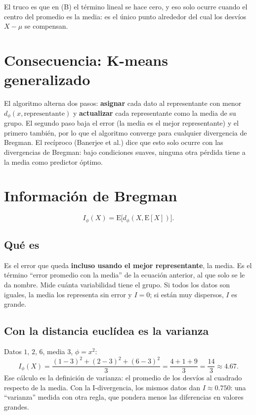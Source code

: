 \documentclass[11pt,a4paper]{article}
\newenvironment{idea}{\par\begin{center}\begin{lrbox}{\ideabox}\begin{minipage}{0.9\linewidth}}{\end{minipage}\end{lrbox}\fcolorbox{blue!40!black}{blue!5}{\usebox{\ideabox}}\end{center}}
\begin{document}
\begin{idea}
El truco es que en (B) el término lineal se hace cero, y eso solo ocurre cuando el
centro del promedio es la media: es el único punto alrededor del cual los desvíos
$X-\mu$ se compensan.
\end{idea}

\section{Consecuencia: K-means generalizado}

El algoritmo alterna dos pasos: \textbf{asignar} cada dato al representante con
menor $d_\phi(x,\text{representante})$ y \textbf{actualizar} cada representante
como la media de su grupo. El segundo paso baja el error (la media es el mejor
representante) y el primero también, por lo que el algoritmo converge para
cualquier divergencia de Bregman. El recíproco (Banerjee et al.) dice que esto
solo ocurre con las divergencias de Bregman: bajo condiciones suaves, ninguna otra
pérdida tiene a la media como predictor óptimo.

\section{Información de Bregman}

\[
  I_\phi(X)=\mathrm{E}\bigl[d_\phi(X,\mathrm{E}[X])\bigr].
\]

\subsection{Qué es}

Es el error que queda \textbf{incluso usando el mejor representante}, la media. Es
el término ``error promedio con la media'' de la ecuación anterior, al que solo se
le da nombre. Mide cuánta variabilidad tiene el grupo. Si todos los datos son
iguales, la media los representa sin error y $I=0$; si están muy dispersos, $I$ es
grande.

\subsection{Con la distancia euclídea es la varianza}

Datos $1$, $2$, $6$, media 3, $\phi=x^2$:
\[
  I_\phi(X)=\frac{(1-3)^2+(2-3)^2+(6-3)^2}{3}=\frac{4+1+9}{3}=\frac{14}{3}\approx4.67.
\]
Ese cálculo es la definición de varianza: el promedio de los desvíos al cuadrado
respecto de la media. Con la I-divergencia, los mismos datos dan $I\approx0.750$:
una ``varianza'' medida con otra regla, que pondera menos las diferencias en
valores grandes.
\end{document}
